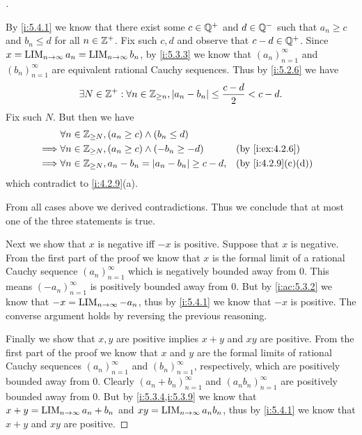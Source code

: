 \begin{proof}[]
\begin{itemize}
          By \cref{i:5.4.1} we know that there exist some \(c \in \mathbb{Q}^+\) and \(d \in \mathbb{Q}^-\) such that \(a_n \geq c\) and \(b_n \leq d\) for all \(n \in \mathbb{Z}^+\).
          Fix such \(c, d\) and observe that \(c - d \in \mathbb{Q}^+\).
          Since \(x = \operatorname*{LIM}_{n \to \infty} a_n = \operatorname*{LIM}_{n \to \infty} b_n\), by \cref{i:5.3.3} we know that \((a_n)_{n = 1}^\infty\) and \((b_n)_{n = 1}^\infty\) are equivalent rational Cauchy sequences.
          Thus by \cref{i:5.2.6} we have
          \[
            \exists N \in \mathbb{Z}^+ : \forall n \in \mathbb{Z}_{\geq n}, \left\lvert a_n - b_n\right\rvert \leq \dfrac{c - d}{2} < c - d.
          \]
          Fix such \(N\).
          But then we have
          \begin{align*}
                     & \forall n \in \Z_{\geq N}, (a_n \geq c) \land (b_n \leq d)                                \\
            \implies & \forall n \in \Z_{\geq N}, (a_n \geq c) \land (-b_n \geq -d)       &  & \by{i:ex:4.2.6}   \\
            \implies & \forall n \in \Z_{\geq N}, a_n - b_n = \abs{a_n - b_n} \geq c - d, &  & \by{i:4.2.9}[c,d]
          \end{align*}
          which contradict to \cref{i:4.2.9}(a).
  \end{itemize}
  From all cases above we derived contradictions.
  Thus we conclude that at most one of the three statements is true.

  Next we show that \(x\) is negative iff \(-x\) is positive.
  Suppose that \(x\) is negative.
  From the first part of the proof we know that \(x\) is the formal limit of a rational Cauchy sequence \((a_n)_{n = 1}^\infty\) which is negatively bounded away from \(0\).
  This means \((-a_n)_{n = 1}^\infty\) is positively bounded away from \(0\).
  But by \cref{i:ac:5.3.2} we know that \(-x = \operatorname*{LIM}_{n \to \infty} -a_n\), thus by \cref{i:5.4.1} we know that \(-x\) is positive.
  The converse argument holds by reversing the previous reasoning.

  Finally we show that \(x, y\) are positive implies \(x + y\) and \(xy\) are positive.
  From the first part of the proof we know that \(x\) and \(y\) are the formal limits of rational Cauchy sequences \((a_n)_{n = 1}^\infty\) and \((b_n)_{n = 1}^\infty\), respectively, which are positively bounded away from \(0\).
  Clearly \((a_n + b_n)_{n = 1}^\infty\) and \((a_n b_n)_{n = 1}^\infty\) are positively bounded away from \(0\).
  But by \cref{i:5.3.4,i:5.3.9} we know that \(x + y = \operatorname*{LIM}_{n \to \infty} a_n + b_n\) and \(xy = \operatorname*{LIM}_{n \to \infty} a_n b_n\), thus by \cref{i:5.4.1} we know that \(x + y\) and \(xy\) are positive.
\end{proof}

